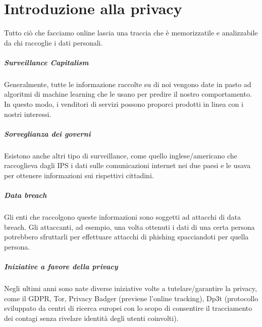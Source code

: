 \chapter{Introduzione alla privacy}

Tutto ciò che facciamo online lascia una traccia che è memorizzatile e analizzabile da chi raccoglie i dati personali.

\paragraph{Surveillance Capitalism} Generalmente, tutte le informazione raccolte su di noi vengono date in pasto ad algoritmi di machine learning che le usano per predire il nostro comportamento. In questo modo, i venditori di servizi possono proporci prodotti in linea con i nostri interessi.

\paragraph{Sorveglianza dei governi} Esistono anche altri tipo di surveillance, come quello inglese/americano che raccoglieva dagli IPS i dati sulle comunicazioni internet nei due paesi e le usava per ottenere informazioni sui rispettivi cittadini.

\paragraph{Data breach} Gli enti che raccolgono queste informazioni sono soggetti ad attacchi di data breach. Gli attaccanti, ad esempio, una volta ottenuti i dati di una certa persona potrebbero sfruttarli per effettuare attacchi di phishing spacciandoti per quella persona.

\paragraph{Iniziative a favore della privacy} Negli ultimi anni sono nate diverse iniziative volte a tutelare/garantire la privacy, come il GDPR, Tor, Privacy Badger (previene l'online tracking), Dp3t (protocollo sviluppato da centri di ricerca europei con lo scopo di consentire il tracciamento dei contagi senza rivelare identità degli utenti coinvolti).

